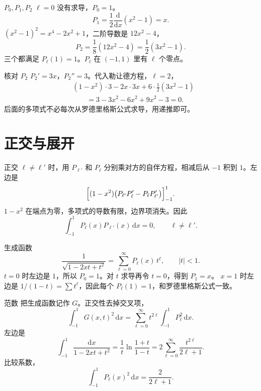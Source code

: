 \documentclass[fontset=windows, chinese, 10pt, xcolor=dvipsnames]{beamer}
\begin{document}
\begin{frame}{$P_0,P_1,P_2$}
  $\ell=0$ 没有求导，$P_0=1$。
  \[
    P_1=\frac12\frac{\mathrm{d}}{\mathrm{d}x}(x^2-1)=x.
  \]
  $(x^2-1)^2=x^4-2x^2+1$，二阶导数是 $12x^2-4$，
  \[
    P_2=\frac{1}{8}(12x^2-4)=\frac12(3x^2-1).
  \]
  三个都满足 $P_{\ell}(1)=1$。$P_{\ell}$ 在 $(-1,1)$ 里有 $\ell$ 个零点。
\end{frame}

\begin{frame}{核对 $P_2$}
  $P_2'=3x$，$P_2''=3$。代入勒让德方程，$\ell=2$，
  \begin{align*}
    &(1-x^2)\cdot 3-2x\cdot 3x+6\cdot\frac12(3x^2-1)\\
    &\qquad=3-3x^2-6x^2+9x^2-3=0.
  \end{align*}
  后面的多项式不必每次从罗德里格斯公式求导，用递推即可。
\end{frame}

\section{正交与展开}

\begin{frame}{正交}
  $\ell\neq\ell'$ 时，用 $P_{\ell'}$ 和 $P_{\ell}$ 分别乘对方的自伴方程，相减后从 $-1$ 积到 $1$。左边是
  \[
    \Bigl[(1-x^2)\bigl(P_{\ell'}P_{\ell}'-P_{\ell}P_{\ell'}'\bigr)\Bigr]_{-1}^{1}.
  \]
  $1-x^2$ 在端点为零，多项式的导数有限，边界项消失。因此
  \begin{equation*}
    \int_{-1}^{1}P_{\ell}(x)P_{\ell'}(x)\,\mathrm{d}x=0,
    \qquad\ell\neq\ell'.
  \end{equation*}
\end{frame}

\begin{frame}{生成函数}
  \begin{equation*}
    \frac{1}{\sqrt{1-2xt+t^2}}
    =\sum_{\ell=0}^{\infty}P_{\ell}(x)\,t^{\ell},
    \qquad |t|<1.
  \end{equation*}
  $t=0$ 时左边是 $1$，所以 $P_0=1$。对 $t$ 求导再令 $t=0$，得到 $P_1=x$。
  \vspace{0.3em}
  $x=1$ 时左边是 $1/(1-t)=\sum t^{\ell}$，因此每个 $P_{\ell}(1)=1$，和罗德里格斯公式一致。
\end{frame}

\begin{frame}{范数}
  把生成函数记作 $G$。正交性去掉交叉项，
  \[
    \int_{-1}^{1}G(x,t)^2\,\mathrm{d}x
    =\sum_{\ell=0}^{\infty}t^{2\ell}\int_{-1}^{1}P_{\ell}^2\,\mathrm{d}x.
  \]
  左边是
  \[
    \int_{-1}^{1}\frac{\mathrm{d}x}{1-2xt+t^2}
    =\frac1t\ln\frac{1+t}{1-t}
    =2\sum_{\ell=0}^{\infty}\frac{t^{2\ell}}{2\ell+1}.
  \]
  比较系数，
  \begin{equation*}
    \boxed{\displaystyle
      \int_{-1}^{1}P_{\ell}(x)^2\,\mathrm{d}x=\frac{2}{2\ell+1}.}
  \end{equation*}
\end{frame}
\end{document}
